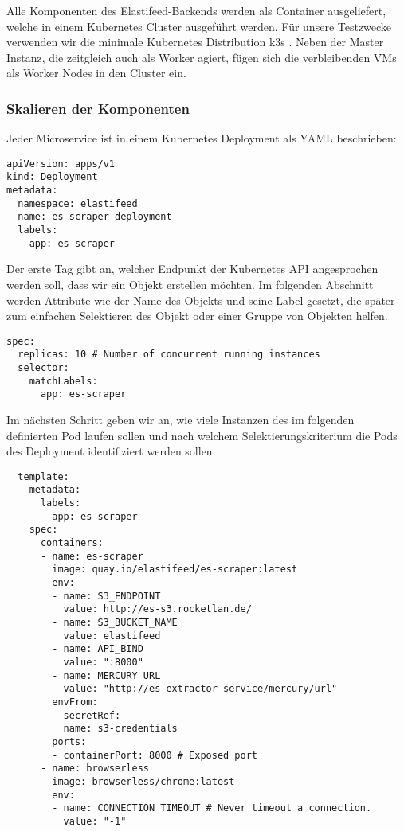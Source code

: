 Alle Komponenten des Elastifeed-Backends werden als Container ausgeliefert, welche in einem Kubernetes Cluster ausgeführt werden.
Für unsere Testzwecke verwenden wir die minimale Kubernetes Distribution k3s \cite{k3s}.
Neben der Master Instanz, die zeitgleich auch als Worker agiert, fügen sich die verbleibenden VMs als Worker Nodes in den Cluster ein.

\subsubsection{Skalieren der Komponenten}

Jeder Microservice ist in einem Kubernetes Deployment als YAML beschrieben:
\begin{lstlisting}
apiVersion: apps/v1
kind: Deployment
metadata:
  namespace: elastifeed
  name: es-scraper-deployment
  labels:
    app: es-scraper
\end{lstlisting}
Der erste Tag  gibt an, welcher Endpunkt der Kubernetes API angesprochen werden soll,  dass wir ein  Objekt erstellen möchten.
Im folgenden  Abschnitt werden Attribute wie der Name des Objekts und seine Label gesetzt, die später zum einfachen Selektieren des Objekt oder einer Gruppe von Objekten helfen.

\begin{lstlisting}
spec:
  replicas: 10 # Number of concurrent running instances
  selector:
    matchLabels:
      app: es-scraper
\end{lstlisting}

Im nächsten Schritt geben wir an, wie viele Instanzen des im folgenden definierten Pod laufen sollen und nach welchem Selektierungskriterium die Pods des Deployment identifiziert werden sollen.

\begin{lstlisting}
  template:
    metadata:
      labels:
        app: es-scraper
    spec:
      containers:
      - name: es-scraper
        image: quay.io/elastifeed/es-scraper:latest
        env:
        - name: S3_ENDPOINT
          value: http://es-s3.rocketlan.de/
        - name: S3_BUCKET_NAME
          value: elastifeed
        - name: API_BIND
          value: ":8000"
        - name: MERCURY_URL
          value: "http://es-extractor-service/mercury/url"
        envFrom:
        - secretRef:
          name: s3-credentials
        ports:
        - containerPort: 8000 # Exposed port
      - name: browserless
        image: browserless/chrome:latest
        env:
        - name: CONNECTION_TIMEOUT # Never timeout a connection.
          value: "-1"
\end{lstlisting}

